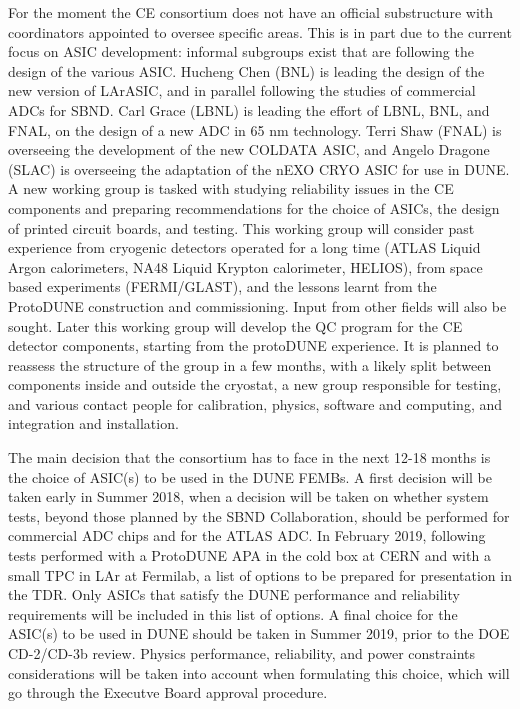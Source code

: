 For the moment the CE consortium does not have an official substructure
with coordinators appointed to oversee specific areas. This is in part due
to the current focus on ASIC development: informal subgroups exist that
are following the design of the various ASIC. Hucheng Chen (BNL) is leading the
design of the new version of LArASIC, and in parallel following the studies
of commercial ADCs for SBND. Carl Grace (LBNL) is leading the effort of
LBNL, BNL, and FNAL, on the design of a new ADC in 65 nm technology. Terri
Shaw (FNAL) is overseeing the development of the new COLDATA ASIC, and
Angelo Dragone (SLAC) is overseeing the adaptation of the nEXO CRYO ASIC
for use in DUNE. A new working group is tasked with studying reliability
issues in the CE components and preparing recommendations for the choice
of ASICs, the design of printed circuit boards, and testing. This working group
will consider past experience from cryogenic detectors operated for a long
time (ATLAS Liquid Argon calorimeters, NA48 Liquid Krypton calorimeter, HELIOS),
from space based experiments (FERMI/GLAST), and the lessons learnt from
the ProtoDUNE construction and commissioning. Input from other fields will
also be sought. Later this working group will develop the QC program for the CE detector
components, starting from the protoDUNE experience. It is planned to
reassess the structure of the group in a few months, with a likely split
between components inside and outside the cryostat, a new group responsible
for testing, and various contact people for calibration, physics, software and
computing, and integration and installation.
 
The main decision that the consortium has to face in the next 12-18 months
is the choice of ASIC(s) to be used in the DUNE FEMBs. A first decision will
be taken early in Summer 2018, when a decision will be taken on whether system
tests, beyond those planned by the SBND Collaboration, should be performed for 
commercial ADC chips and for the ATLAS ADC. In February 2019, following tests
performed with a ProtoDUNE APA in the cold box at CERN and with a small TPC in
LAr at Fermilab, a list of options to be prepared for presentation in the TDR.
Only ASICs that satisfy the DUNE performance and reliability requirements
will be included in this list of options. A final choice for the ASIC(s) to
be used in DUNE should be taken in Summer 2019, prior to the DOE CD-2/CD-3b
review. Physics performance, reliability, and power constraints considerations
will be taken into account when formulating this choice, which will go through
the Executve Board approval procedure.
